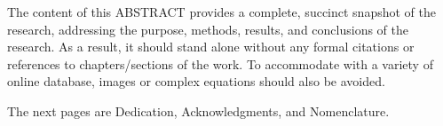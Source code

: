 The content of this ABSTRACT provides a complete, succinct snapshot of the
research, addressing the purpose, methods, results, and conclusions of the
research. As a result, it should stand alone without any formal citations or
references to chapters/sections of the work. To accommodate with a variety of online database, images or complex equations should also be avoided.

The next pages are Dedication, Acknowledgments, and Nomenclature.


\pagebreak{}
